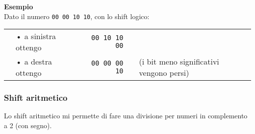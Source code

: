 \documentclass[../main.tex]{subfiles}
\begin{document}
\begin{table}[h!]
\begin{minipage}{.45\linewidth}
        \vspace*{3mm}

        \centering

    \end{minipage}
\end{table}

\noindent
\textbf{Esempio} \\
Dato il numero \texttt{00 00 10 10}, con lo shift logico: \\
\hspace*{-2.2mm}
\begin{tabular}{ c l p{2mm} r c l }
    & • \hspace{-.5mm} a sinistra ottengo & & \texttt{00 10 10 00} \\
    & • \hspace{-.5mm} a destra ottengo & & \texttt{00 00 00 10} & & (i bit meno significativi vengono persi) \\
\end{tabular}

\subsubsection{Shift aritmetico}
Lo shift aritmetico mi permette di fare una divisione per numeri in
complemento a 2 (con segno).

\begin{table}[h!]
    \centering

    \hspace*{-6.48mm}
\end{table}
\end{document}
